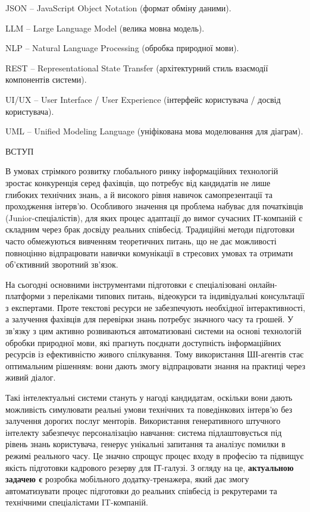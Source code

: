 \documentclass[
]{article}
\begin{document}
JSON -- JavaScript Object Notation (формат обміну даними).

LLM -- Large Language Model (велика мовна модель).

NLP -- Natural Language Processing (обробка природної мови).

REST -- Representational State Transfer (архітектурний стиль взаємодії
компонентів системи).

UI/UX -- User Interface / User Experience (інтерфейс користувача /
досвід користувача).

UML -- Unified Modeling Language (уніфікована мова моделювання для
діаграм).

\protect{}\label{_Toc228981050}{}ВСТУП

В умовах стрімкого розвитку глобального ринку інформаційних технологій
зростає конкуренція серед фахівців, що потребує від кандидатів не лише
глибоких технічних знань, а й високого рівня навичок самопрезентації та
проходження інтерв'ю. Особливого значення ця проблема набуває для
початківців (Junior-спеціалістів), для яких процес адаптації до вимог
сучасних ІТ-компаній є складним через брак досвіду реальних співбесід.
Традиційні методи підготовки часто обмежуються вивченням теоретичних
питань, що не дає можливості повноцінно відпрацювати навички комунікації
в стресових умовах та отримати об'єктивний зворотний зв'язок.

На сьогодні основними інструментами підготовки є спеціалізовані
онлайн-платформи з переліками типових питань, відеокурси та
індивідуальні консультації з експертами. Проте текстові ресурси не
забезпечують необхідної інтерактивності, а залучення фахівців для
перевірки знань потребує значного часу та грошей. У зв'язку з цим
активно розвиваються автоматизовані системи на основі технологій обробки
природної мови, які прагнуть поєднати доступність інформаційних ресурсів
із ефективністю живого спілкування. Тому використання ШІ-агентів стає
оптимальним рішенням: вони дають змогу відпрацювати знання на практиці
через живий діалог.

Такі інтелектуальні системи стануть у нагоді кандидатам, оскільки вони
дають можливість симулювати реальні умови технічних та поведінкових
інтерв'ю без залучення дорогих послуг менторів. Використання
генеративного штучного інтелекту забезпечує персоналізацію навчання:
система підлаштовується під рівень знань користувача, генерує унікальні
запитання та аналізує помилки в режимі реального часу. Це значно спрощує
процес входу в професію та підвищує якість підготовки кадрового резерву
для ІТ-галузі. З огляду на це, \textbf{актуальною задачею є} розробка
мобільного додатку-тренажера, який дає змогу автоматизувати процес
підготовки до реальних співбесід із рекрутерами та технічними
спеціалістами IT-компаній.
\end{document}
